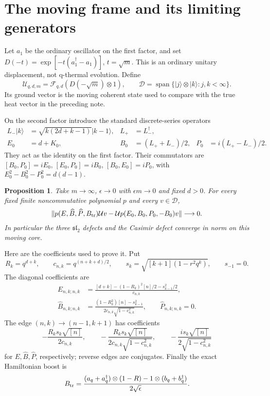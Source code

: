 \documentclass[11pt]{article}
\newtheorem{proposition}{Proposition}
\newcommand{\eps}{\epsilon}
\newcommand{\ket}[1]{|#1\rangle}
\newcommand{\B}{\widehat B}
\newcommand{\PP}{\widehat P}
\newcommand{\Bt}{B_{\rm tr}}
\newcommand{\U}{\mathcal U}
\newcommand{\F}{\mathcal F}
\newcommand{\D}{\mathcal D}
\begin{document}
\newpage
\section{The moving frame and its limiting generators}
Let $a_1$ be the ordinary oscillator on the first factor, and
set $D(-t)=\exp[-t(a_1^\dagger-a_1)]$, $t=\sqrt m$.
This is an ordinary unitary displacement, not q-thermal
evolution. Define
\begin{equation}
 \U_{q,d,m}=\F_{q,d}(D(-\sqrt m)\otimes1),\qquad
 \D=\operatorname{span}\{\ket j\otimes\ket k:j,k<\infty\}.
 \label{moving}
\end{equation}
Its ground vector is the moving coherent state used to compare
with the true heat vector in the preceding note.

On the second factor introduce the standard discrete-series
operators
\begin{align}
 L_-\ket k&=\sqrt{k(2d+k-1)}\ket{k-1},&L_+&=L_-^\dagger,\\
 E_0&=d+K_0,&B_0&=(L_++L_-)/2,&P_0&=i(L_+-L_-)/2.
\end{align}
They act as the identity on the first factor. Their commutators
are $[B_0,P_0]=iE_0$, $[E_0,P_0]=iB_0$,
$[B_0,E_0]=iP_0$, with
$E_0^2-B_0^2-P_0^2=d(d-1)$.

\begin{proposition}\label{words}
Take $m\to\infty$, $\eps\to0$ with $\eps m\to0$ and fixed
$d>0$. For every fixed finite noncommutative polynomial $p$
and every $v\in\D$,
\begin{equation}
 \|p(E,\B,\PP,\Bt)\U v
 -\U p(E_0,B_0,P_0,-B_0)v\|\longrightarrow0.\label{wordlimit}
\end{equation}
In particular the three $\mathfrak{sl}_2$ defects and the
Casimir defect converge in norm on this moving core.
\end{proposition}

Here are the coefficients used to prove it. Put
\[
R_k=q^{d+k},\qquad c_{n,k}=q^{(n+k+d)/2},\qquad
s_k=\sqrt{[k+1](1-r^2q^k)},\qquad s_{-1}=0.
\]
The diagonal coefficients are
\begin{align}
 E_{n,k;n,k}&=
 \frac{[d+k]-(1-R_k)^2[n]/2-s_{k-1}^2/2}{c_{n,k}},\\
 \B_{n,k;n,k}&=
 \frac{(1-R_k^2)[n]-s_{k-1}^2}
 {2c_{n,k}\sqrt{1-c_{n,k}^2}},\qquad \PP_{n,k;n,k}=0.
\end{align}
The edge $(n,k)\to(n-1,k+1)$ has coefficients
\begin{equation}
 -\frac{R_ks_k\sqrt{[n]}}{2c_{n,k}},\qquad
 -\frac{R_ks_k\sqrt{[n]}}{2c_{n,k}\sqrt{1-c_{n,k}^2}},\qquad
 -\frac{i s_k\sqrt{[n]}}{2\sqrt{1-c_{n,k}^2}}\label{edge}
\end{equation}
for $E,\B,\PP$, respectively; reverse edges are conjugates.
Finally the exact Hamiltonian boost is
\begin{equation}
 \Bt=\frac{(a_q+a_q^\dagger)\otimes(1-R)
                   -1\otimes(b_q+b_q^\dagger)}{2\sqrt\eps}.
 \label{boost}
\end{equation}
\end{document}
